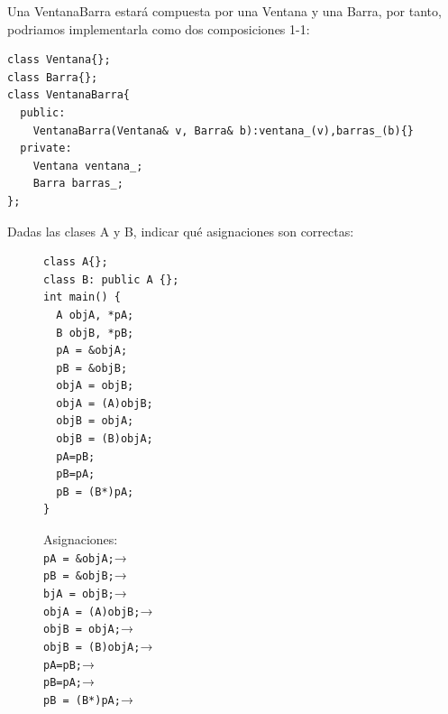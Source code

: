 Una VentanaBarra estará compuesta por una Ventana y una Barra, por tanto, podriamos implementarla como dos composiciones 1-1:
\begin{verbatim}
class Ventana{};
class Barra{};
class VentanaBarra{
  public:
    VentanaBarra(Ventana& v, Barra& b):ventana_(v),barras_(b){}
  private:
    Ventana ventana_;
    Barra barras_;
};
\end{verbatim}

 Dadas las clases A y B, indicar qué asignaciones son correctas:
\begin{figure}[h]
\begin{minipage}{0.35\textwidth}
\begin{lstlisting}[frame = single]
class A{};
class B: public A {};
int main() {
  A objA, *pA;
  B objB, *pB;
  pA = &objA;
  pB = &objB;
  objA = objB;
  objA = (A)objB;
  objB = objA;
  objB = (B)objA;
  pA=pB;
  pB=pA;
  pB = (B*)pA;
}
\end{lstlisting}
\end{minipage}
\hfill
\begin{minipage}{0.6\textwidth}
Asignaciones:\\
\texttt{pA = \&objA;}→  \\
\texttt{pB = \&objB;}→  \\
\texttt{bjA = objB;}→  \\
\texttt{objA = (A)objB;}→  \\
\texttt{objB = objA;}→  \\
\texttt{objB = (B)objA;}→  \\
\texttt{pA=pB;}→  \\
\texttt{pB=pA;}→  \\
\texttt{pB = (B*)pA;}→  \\

\end{minipage}
\end{figure}

